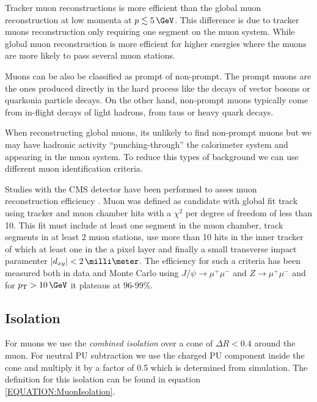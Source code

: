 Tracker muon reconstructions is more efficient than the global muon reconstruction at low momenta at $p\lesssim 5\,\GeV$. This difference is due to tracker muons reconstruction only requiring one segment on the muon system. While global muon reconstruction is more efficient for higher energies where the muons are more likely to pass several muon stations.

Muons can be also be classified as prompt of non-prompt. The prompt muons are the ones produced directly in the hard process like the decays of vector bosons or quarkonia particle decays. On the other hand, non-prompt muons typically come from in-flight decays of light hadrons, from taus or heavy quark decays. 

When reconstructing global muons, its unlikely to find non-prompt muons but we may have hadronic activity ``punching-through'' the calorimeter system and appearing in the muon system. To reduce this types of background we can use different muon identification criteria. 

Studies with the \gls{CMS} detector have been performed to asses muon reconstruction efficiency \cite{ARTICLE:CMSMuonReconstruction7TeV}. Muon was defined as candidate with global fit track using tracker and muon chamber hits with a $\chi^2$ per degree of freedom of less than 10. This fit must include at least one segment in the muon chamber, track segments in at least 2 muon stations, use more than 10 hits in the inner tracker of which at least one in the a pixel layer and finally a small transverse impact paramenter $|d_{xy}|< 2\,\milli\meter$. The efficiency for such a criteria has been measured both in data and Monte Carlo using $J/\psi \rightarrow \mu^+ \mu^-$ and $Z \rightarrow \mu^+ \mu^-$ and for $\pt > 10 \,\GeV$ it plateaus at 96-99\%.

\subsection{Isolation}
\label{SUBSECTION:EventReconstructionAndSimulation_LeptonIsolation_MuonsIsolation}



For muons we use the \textit{combined isolation} over a cone of $\Delta R < 0.4$ around the muon. For neutral \gls{PU} subtraction we use the charged \gls{PU} component inside the cone and multiply it by a factor of 0.5 which is determined from simulation. The definition for this isolation can be found in equation \ref{EQUATION:MuonIsolation}.


